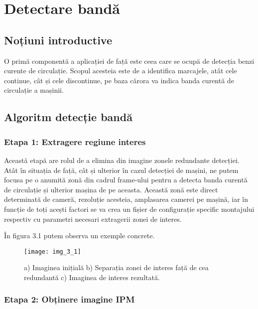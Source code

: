 \section{Detectare bandă}
\subsection{Noțiuni introductive}
O primă componentă a aplicației de față este ceea care se ocupă de detecția benzi curente de circulație. Scopul acesteia este de a identifica marcajele, atât cele continue, cât și cele discontinue, pe baza cărora va indica banda curentă de circulație a mașinii.

\subsection{Algoritm detecție bandă}
\subsubsection{Etapa 1: Extragere regiune interes}

Această etapă are rolul de a elimina din imagine zonele redundante detecției. Atât în situația de față, cât și ulterior în cazul detecției de mașini, ne putem focusa pe o anumită zonă din cadrul frame-ului pentru a detecta banda curentă de circulație și ulterior mașina de pe aceasta. Această zonă este direct determinată de cameră, rezoluție acesteia, amplasarea camerei pe mașină, iar în funcție de toți acești factori se va crea un fișier de configurație specific montajului respectiv cu parametri necesari extragerii zonei de interes.

În figura 3.1 putem observa un exemple concrete.
\begin{figure}[!h]
	\centering
	\texttt{[image: img\_3\_1]}
	\caption[Zonă interes imagine]{a) Imaginea inițială b) Separația zonei de interes față de cea redundantă c) Imaginea de interes rezultată.}
\end{figure}

\subsubsection{Etapa 2: Obținere imagine IPM}

